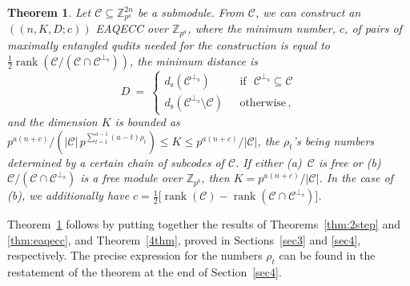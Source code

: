 \documentclass{article}
\DeclareMathOperator{\rank}{rank}
\def\Z{\mathbb{Z}}
\newtheorem{thm}{Theorem}[section]
\theoremstyle{remark}
\theoremstyle{definition}
\numberwithin{equation}{section}
\begin{document}
\begin{thm}\label{dt2} Let  $\mathcal{C} \subseteq \mathbb{Z}_{p^a}^{2n}$ be a submodule. From $\mathcal{C}$, we can construct an $((n,K, D; c))$ EAQECC over $\Z_{p^a}$, where the minimum number, $c$, of pairs of maximally entangled qudits needed for the construction is equal to $\frac12 \rank(\mathcal{C}/(\mathcal{C} \cap \mathcal{C}^{\perp_{\mathrm{s}}}))$,  the minimum distance is 
\begin{equation*}
D~=~\left\{\begin{array}{ll}
d_{\mathrm{s}}(\mathcal{C}^{\perp_{\mathrm{s}}}) & \text{~~if~~} \mathcal{C}^{\perp_{\mathrm{s}}} \subseteq \mathcal{C} \\  
d_{\mathrm{s}}(\mathcal{C}^{\perp_{\mathrm{s}}}\setminus \mathcal{C} )  & \text{~~otherwise} \, , \end{array}\right. 
\end{equation*}
and the dimension $K$ is bounded as $p^{a(n+c)}/ (|\mathcal{C}| \, {p^{\sum_{t=1}^{a-1} (a-t)\rho_t}}) \leq  K \leq p^{a(n+c)}/|\mathcal{C}|$, the $\rho_t$'s being numbers determined by a certain chain of subcodes of $\mathcal{C}$. If either \emph{(a)}~$\mathcal{C}$ is free or \emph{(b)}~$\mathcal{C}/(\mathcal{C} \cap \mathcal{C}^{\perp_{\mathrm{s}}})$ is a free module over $\mathbb{Z}_{p^b}$, then $K = p^{a(n+c)}/|\mathcal{C}|$. In the case of \emph{(b)}, we additionally have $c=\frac12 \bigl[\rank(\mathcal{C}) - \rank(\mathcal{C} \cap \mathcal{C}^{\perp_{\mathrm{s}}})\bigr]$.
 \end{thm}

\medskip

Theorem~\ref{dt2} follows by putting together the results of Theorems~\ref{thm:2step} and \ref{thm:eaqecc}, and Theorem~\ref{4thm}, proved in Sections~\ref{sec3} and \ref{sec4}, respectively. The precise expression for the numbers $\rho_t$ can be found in the restatement of the theorem at the end of Section~\ref{sec4}.
\end{document}
